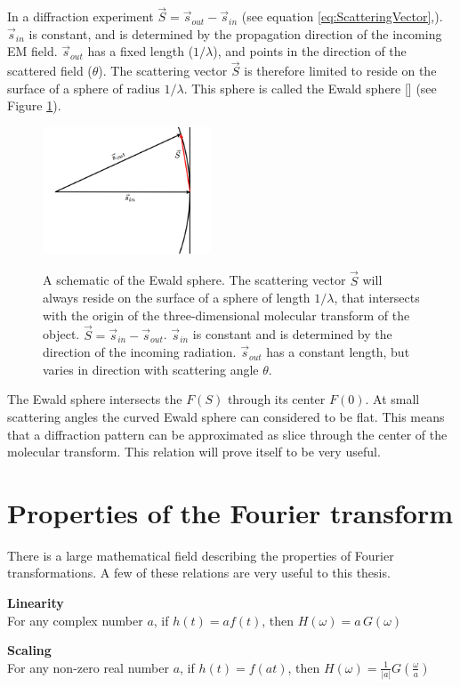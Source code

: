 In a diffraction experiment $\vec{S} = \vec{s}_{out} -\vec{s}_{in}$ (see equation \ref{eq:ScatteringVector},). $\vec{s}_{in}$ is constant, and is determined by the propagation direction of the incoming EM field. $\vec{s}_{out}$ has a fixed length ($1/\lambda$), and points in the direction of the scattered field ($\theta$). The scattering vector $\vec{S}$ is therefore limited to reside on the surface of a sphere of radius $1/\lambda$. This sphere is called the Ewald sphere [] (see Figure \ref{fig:EwaldSphere}). 

\begin{figure}[h]
	\centering 
	\includegraphics[width=50mm]{ewald_sphere.png}
	\label{fig:EwaldSphere}
	\caption{A schematic of the Ewald sphere. The scattering vector $\vec{S}$ will always reside on the surface of a sphere of length $1/\lambda$, that intersects with the origin of the three-dimensional molecular transform of the object. $\vec{S} = \vec{s}_{in} - \vec{s}_{out}$. $\vec{s}_{in}$ is constant and is determined by the direction of the incoming radiation. $\vec{s}_{out}$ has a constant length, but varies in direction with scattering angle $\theta$. }
\end{figure}

The Ewald sphere intersects the $F(S)$ through its center $F(0)$. At small scattering angles the curved Ewald sphere can considered to be flat. This means that a diffraction pattern can be approximated as slice through the center of the molecular transform.  This relation will prove itself to be very useful.

\section{Properties of the Fourier transform}
There is a large mathematical field describing the properties of Fourier transformations. A few of these relations are very useful to this thesis.

\textbf{Linearity}\\
	For any complex number $a$, if $h(t) = a f(t)$, then $H(\omega) = a \, G(\omega)$

\textbf{Scaling}\\
	For any non-zero real number $a$, if $h(t) = f(a t)$, then $H(\omega) = \frac{1}{|a|} G\left(\frac{\omega}{a}\right)$

